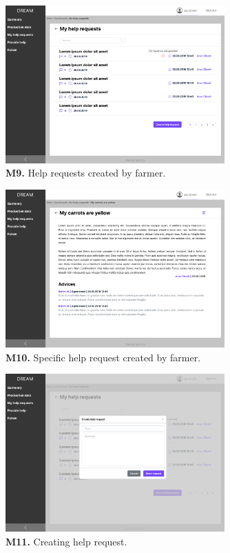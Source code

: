 \begin{figure}[H]
    \centering
    \includegraphics[width=0.75\textwidth]{mockups/Farmer_Dashboard_My help requests.png}
    \caption{\textbf{M9.} Help requests created by farmer.}
\end{figure}

\begin{figure}[H]
    \centering
    \includegraphics[width=0.75\textwidth]{mockups/Farmer_Dashboard_My help requests_VIew request.png}
    \caption{\textbf{M10.} Specific help request created by farmer.}
\end{figure}

\begin{figure}[H]
    \centering
    \includegraphics[width=0.75\textwidth]{mockups/Farmer_Dashboard_My help requests_Create help request.png}
    \caption{\textbf{M11.} Creating help request.}
\end{figure}


